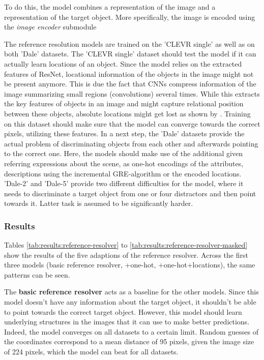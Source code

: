 To do this, the model combines a representation of the image and a representation of the target object.
More specifically, the image is encoded using the \emph{image encoder} submodule



The reference resolution models are trained on the 'CLEVR single' as well as on both 'Dale' datasets.
The 'CLEVR single' dataset should test the model if it can actually learn locations of an object.
Since the model relies on the extracted features of ResNet, locational information of the objects in the image might not be present anymore.
This is due the fact that CNNs compress information of the image summarizing small regions (convolutions) several times.
While this extracts the key features of objects in an image and might capture relational position between these objects, absolute locations might get lost as shown by \citet{Kelleher2017}.
Training on this dataset should make sure that the model can converge towards the correct pixels, utilizing these features.
In a next step, the 'Dale' datasets provide the actual problem of discriminating objects from each other and afterwards pointing to the correct one.
Here, the models should make use of the additional given referring expressions about the scene, as one-hot encodings of the attributes, descriptions using the incremental GRE-algorithm or the encoded locations.
'Dale-2' and 'Dale-5' provide two different difficulties for the model, where it needs to discriminate a target object from one or four distractors and then point towards it.
Latter task is assumed to be significantly harder.

\subsubsection*{Results}
Tables \ref{tab:results:reference-resolver} to \ref{tab:results:reference-resolver-masked} show the results of the five adaptions of the reference resolver.
Across the first three models (basic reference resolver, +one-hot, +one-hot+locations), the same patterns can be seen.

The \textbf{basic reference resolver} acts as a baseline for the other models.
Since this model doesn't have any information about the target object, it shouldn't be able to point towards the correct target object.
However, this model should learn underlying structures in the images that it can use to make better predictions.
Indeed, the model converges on all datasets to a certain limit.
Random guesses of the coordinates correspond to a mean distance of 95 pixels, given the image size of 224 pixels, which the model can beat for all datasets.

